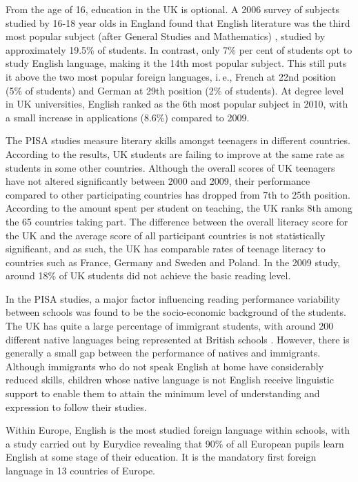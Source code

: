 \begin{multicols}{2}
From the age of 16, education in the UK is optional. A 2006 survey of subjects studied by 16-18 year olds in England found that English literature was the third most popular subject (after General Studies and Mathematics) \cite{camb}, studied by approximately 19.5\% of students. In contrast, only 7\% per cent of students opt to study English language, making it the 14th most popular subject. This still puts it above the two most popular foreign languages, i.\,e., French at 22nd position (5\% of students) and German at 29th position (2\% of students). At degree level in UK universities, English ranked as the 6th most popular subject in 2010, with a small increase in applications (8.6\%) compared to 2009.

The PISA studies \cite{pisa} measure literary skills amongst teenagers in different countries. According to the results, UK students are failing to improve at the same rate as students in some other countries. Although the overall scores of UK teenagers have not altered significantly between 2000 and 2009, their performance compared to other participating countries has dropped from 7th to 25th position. According to the amount spent per student on teaching, the UK ranks 8th among the 65 countries taking part. The difference between the overall literacy score for the UK and the average score of all participant countries is not statistically significant, and as such, the UK has comparable rates of teenage literacy to countries such as France, Germany and Sweden and Poland. In the 2009 study, around 18\% of UK students did not achieve the basic reading level.

In the PISA studies, a major factor influencing reading performance variability between schools was found to be the socio-economic background of the students. The UK has quite a large percentage of immigrant students, with around 200 different native languages being represented at British schools \cite{Leg1}. However, there is generally a small gap between the performance of natives and immigrants. Although immigrants who do not speak English at home have considerably reduced skills, children whose native language is not English receive linguistic support to enable them to attain the minimum level of understanding and expression to follow their studies.

Within Europe, English is the most studied foreign language within schools, with a study carried out by Eurydice \cite{ecea} revealing that 90\% of all European pupils learn English at some stage of their education. It is the mandatory first foreign language in 13 countries of Europe. 


\end{multicols}
